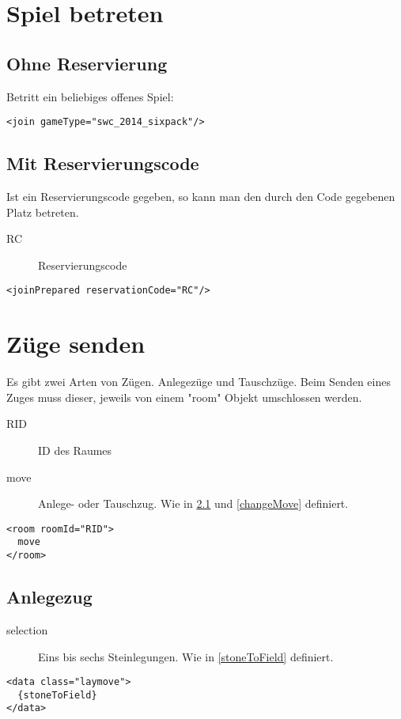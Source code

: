 \documentclass[12pt,a4paper, ngerman, oneside]{scrartcl}
\begin{document}
\section{Spiel betreten}
\subsection{Ohne Reservierung}
Betritt ein beliebiges offenes Spiel:
\begin{verbatim}
<join gameType="swc_2014_sixpack"/>
\end{verbatim}
\subsection{Mit Reservierungscode}
Ist ein Reservierungscode gegeben, so kann man den durch den Code gegebenen Platz betreten.
\begin{description}
\item[RC] Reservierungscode
\end{description}
\begin{verbatim}
<joinPrepared reservationCode="RC"/>
\end{verbatim}

\section{Züge senden}
Es gibt zwei Arten von Zügen. Anlegezüge und Tauschzüge. Beim Senden eines Zuges muss dieser, jeweils von einem "room" Objekt umschlossen werden.
\begin{description}
\item[RID] ID des Raumes
\item[move] Anlege- oder Tauschzug. Wie in \ref{layMove} und \ref{changeMove} definiert.
\end{description}
\begin{verbatim}
<room roomId="RID">
  move
</room>
\end{verbatim}
\subsection{Anlegezug}
\label{layMove}
\begin{description}
\item[selection] Eins bis sechs Steinlegungen. Wie in \ref{stoneToField} definiert.
\end{description}
\begin{verbatim}
<data class="laymove">
  {stoneToField}
</data>
\end{verbatim}
\end{document}
